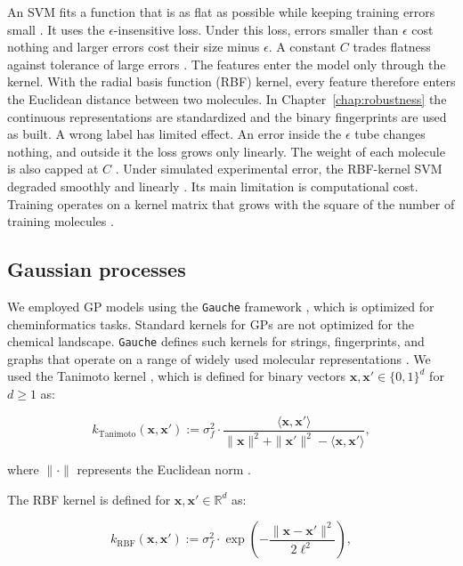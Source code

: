 An SVM fits a function that is as flat as possible while keeping training errors small \citep{Vapnik1995, Smola2004}. It uses the $\epsilon$-insensitive loss. Under this loss, errors smaller than $\epsilon$ cost nothing and larger errors cost their size minus $\epsilon$. A constant $C$ trades flatness against tolerance of large errors \citep{Cortes1995, Smola2004}. The features enter the model only through the kernel. With the radial basis function (RBF) kernel, every feature therefore enters the Euclidean distance between two molecules. In Chapter~\ref{chap:robustness} the continuous representations are standardized and the binary fingerprints are used as built. A wrong label has limited effect. An error inside the $\epsilon$ tube changes nothing, and outside it the loss grows only linearly. The weight of each molecule is also capped at $C$ \citep{Smola2004}. Under simulated experimental error, the RBF-kernel SVM degraded smoothly and linearly \citep{Cortes2015}. Its main limitation is computational cost. Training operates on a kernel matrix that grows with the square of the number of training molecules \citep{Chang2011}.

\subsection{Gaussian processes}

We employed GP models using the \texttt{Gauche} framework \citep{gauche}, which is optimized for cheminformatics tasks. Standard kernels for GPs are not optimized for the chemical landscape. \texttt{Gauche} defines such kernels for strings, fingerprints, and graphs that operate on a range of widely used molecular representations \citep{gauche}. We used the Tanimoto kernel \citep{Ralaivola2005, moss2020}, which is defined for binary vectors $\mathbf{x}, \mathbf{x}' \in \{0, 1\}^d$ for $d \geq 1$ as:

\begin{equation}
k_{\text{Tanimoto}}(\mathbf{x}, \mathbf{x}') := \sigma_f^2 \cdot \frac{\langle \mathbf{x}, \mathbf{x}' \rangle}{\|\mathbf{x}\|^2 + \|\mathbf{x}'\|^2 - \langle \mathbf{x}, \mathbf{x}' \rangle},
\label{eq:tanimoto_kernel}
\end{equation}

where $\|\cdot\|$ represents the Euclidean norm \citep{gauche}. 

The RBF kernel is defined for
$\mathbf{x}, \mathbf{x}' \in \mathbb{R}^d$ as:

\begin{equation}
k_{\text{RBF}}(\mathbf{x}, \mathbf{x}') := \sigma_f^2 \cdot \exp\left(-\frac{\|\mathbf{x} - \mathbf{x}'\|^2}{2\ell^2}\right),
\end{equation}


